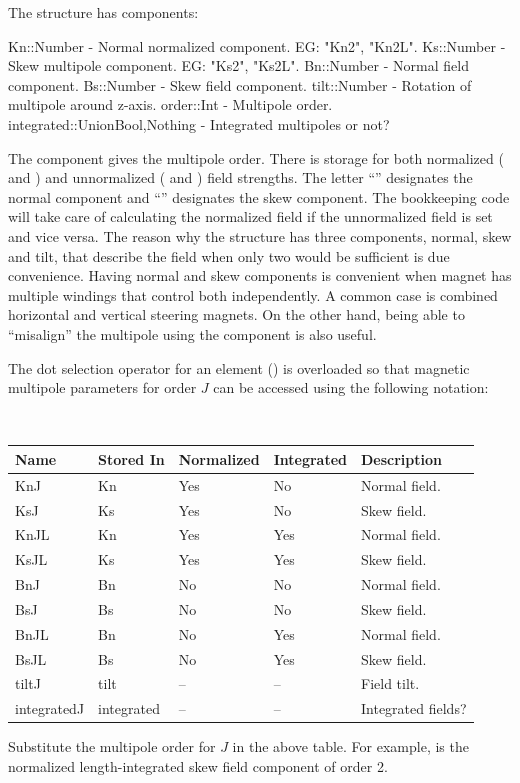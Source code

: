 The  structure has components:
\begin{example}
  Kn::Number     - Normal normalized component. EG: "Kn2", "Kn2L".
  Ks::Number     - Skew multipole component. EG: "Ks2", "Ks2L".
  Bn::Number     - Normal field component.
  Bs::Number     - Skew field component.
  tilt::Number   - Rotation of multipole around z-axis.
  order::Int     - Multipole order.
  integrated::Union{Bool,Nothing} - Integrated multipoles or not? 
\end{example}
The  component gives the multipole order.
There is storage for both normalized ( and ) and unnormalized ( and )
field strengths. The letter ``'' designates the normal component and ``'' designates
the skew component. 
The \accellat bookkeeping code will take care of calculating the normalized field if the unnormalized
field is set and vice versa. The reason why the structure has three components, 
normal, skew and tilt, that describe the field when only two would be sufficient is due convenience.
Having normal and skew components is convenient when magnet has multiple windings that control
both independently. A common case is combined horizontal and vertical steering magnets. On the
other hand, being able to ``misalign'' the multipole using the  component is also
useful.

The dot selection operator for an element () is overloaded so that 
magnetic multipole parameters for order $J$ can be accessed using the following notation:
\hfill\break
{\tt
\begin{tabular}{lllll} \toprule
  Name        & Stored In  & Normalized & Integrated & Description \\ \midrule
  KnJ         & Kn         & Yes        & No         & Normal field. \\
  KsJ         & Ks         & Yes        & No         & Skew field. \\
  KnJL        & Kn         & Yes        & Yes        & Normal field. \\
  KsJL        & Ks         & Yes        & Yes        & Skew field. \\
  BnJ         & Bn         & No         & No         & Normal field. \\
  BsJ         & Bs         & No         & No         & Skew field. \\
  BnJL        & Bn         & No         & Yes        & Normal field. \\
  BsJL        & Bs         & No         & Yes        & Skew field. \\
  tiltJ       & tilt       & --         & --         & Field tilt. \\
  integratedJ & integrated & --         & --         & Integrated fields? \\
\bottomrule
\end{tabular}
}
\hfill\break
Substitute the multipole order for $J$ in the above table. For example,  is the
normalized length-integrated skew field component of order 2. 

